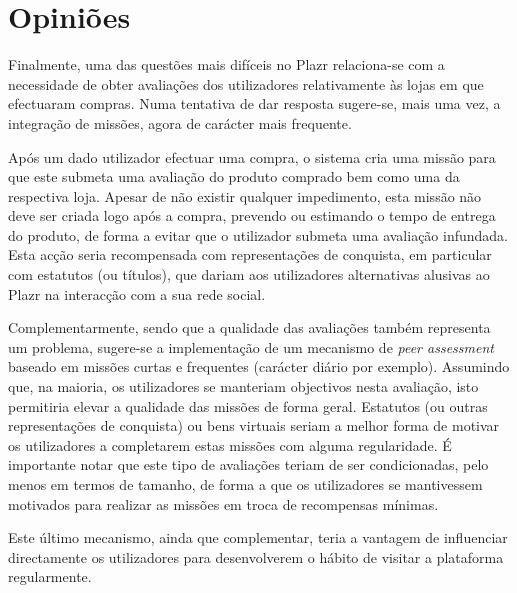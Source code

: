 \section{Opiniões}
Finalmente, uma das questões mais difíceis no Plazr relaciona-se com a necessidade de obter avaliações dos utilizadores relativamente às lojas em que efectuaram compras. Numa tentativa de dar resposta sugere-se, mais uma vez, a integração de missões, agora de carácter mais frequente.

Após um dado utilizador efectuar uma compra, o sistema cria uma missão para que este submeta uma avaliação do produto comprado bem como uma da respectiva loja. Apesar de não existir qualquer impedimento, esta missão não deve ser criada logo após a compra, prevendo ou estimando o tempo de entrega do produto, de forma a evitar que o utilizador submeta uma avaliação infundada.
Esta acção seria recompensada com representações de conquista, em particular com estatutos (ou títulos), que dariam aos utilizadores alternativas alusivas ao Plazr na interacção com a sua rede social.

Complementarmente, sendo que a qualidade das avaliações também representa um problema, sugere-se a implementação de um mecanismo de \textit{peer assessment} baseado em missões curtas e frequentes (carácter diário por exemplo). Assumindo que, na maioria, os utilizadores se manteriam objectivos nesta avaliação, isto permitiria elevar a qualidade das missões de forma geral. Estatutos (ou outras representações de conquista) ou bens virtuais seriam a melhor forma de motivar os utilizadores a completarem estas missões com alguma regularidade. É importante notar que este tipo de avaliações teriam de ser condicionadas, pelo menos em termos de tamanho, de forma a que os utilizadores se mantivessem motivados para realizar as missões em troca de recompensas mínimas.

Este último mecanismo, ainda que complementar, teria a vantagem de influenciar directamente os utilizadores para desenvolverem o hábito de visitar a plataforma regularmente.